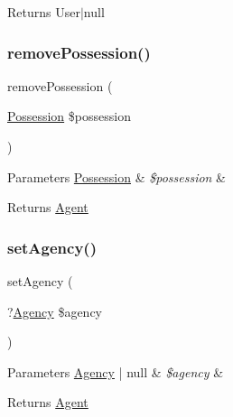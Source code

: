 \begin{DoxyReturn}{Returns}
User$\vert$null 
\end{DoxyReturn}
\mbox{\label{class_app_1_1_entity_1_1_agent_a720a2c7cb1ff271659d4ca746e29ca47}} 
\subsubsection{\texorpdfstring{removePossession()}{removePossession()}}
{\footnotesize\ttfamily remove\+Possession (\begin{DoxyParamCaption}\item[{\mbox{\hyperlink{class_app_1_1_entity_1_1_possession}{Possession}}}]{\$possession }\end{DoxyParamCaption})}


\begin{DoxyParams}[1]{Parameters}
\mbox{\hyperlink{class_app_1_1_entity_1_1_possession}{Possession}} & {\em \$possession} & \\
\hline
\end{DoxyParams}
\begin{DoxyReturn}{Returns}
\mbox{\hyperlink{class_app_1_1_entity_1_1_agent}{Agent}} 
\end{DoxyReturn}
\mbox{\label{class_app_1_1_entity_1_1_agent_aba5066bf731ebfd1dad6e18f82feef38}} 
\subsubsection{\texorpdfstring{setAgency()}{setAgency()}}
{\footnotesize\ttfamily set\+Agency (\begin{DoxyParamCaption}\item[{?\mbox{\hyperlink{class_app_1_1_entity_1_1_agency}{Agency}}}]{\$agency }\end{DoxyParamCaption})}


\begin{DoxyParams}[1]{Parameters}
\mbox{\hyperlink{class_app_1_1_entity_1_1_agency}{Agency}} | null & {\em \$agency} & \\
\hline
\end{DoxyParams}
\begin{DoxyReturn}{Returns}
\mbox{\hyperlink{class_app_1_1_entity_1_1_agent}{Agent}} 
\end{DoxyReturn}
\mbox{\label{class_app_1_1_entity_1_1_agent_a406a111868b45aad6d4c8ab5b0c5bcb9}} 
